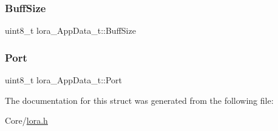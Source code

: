 \subsubsection{\texorpdfstring{Buff\+Size}{BuffSize}}
{\footnotesize\ttfamily uint8\+\_\+t lora\+\_\+\+App\+Data\+\_\+t\+::\+Buff\+Size}

\mbox{\label{structlora__AppData__t_a5ec1eaaeb3098b35864ce2b7ebc4a348}} 
\subsubsection{\texorpdfstring{Port}{Port}}
{\footnotesize\ttfamily uint8\+\_\+t lora\+\_\+\+App\+Data\+\_\+t\+::\+Port}



The documentation for this struct was generated from the following file\+:\begin{DoxyCompactItemize}
\item 
Core/\hyperlink{lora_8h}{lora.\+h}\end{DoxyCompactItemize}
